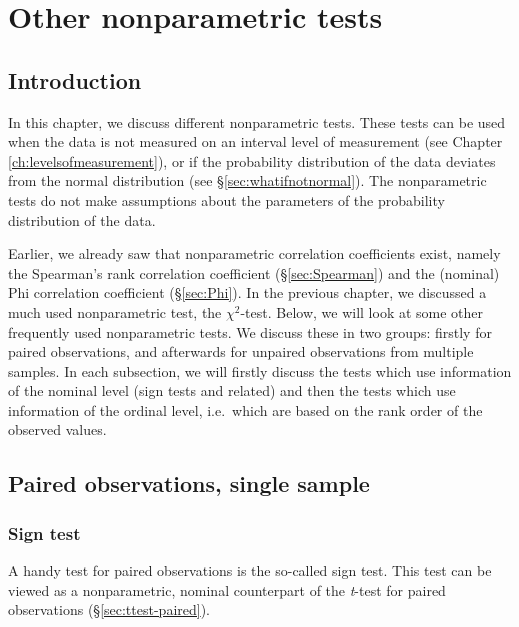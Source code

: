 \documentclass[
]{book}
\begin{document}
\hypertarget{ch:other-nonpar-tests}{%
\chapter{Other nonparametric tests}\label{ch:other-nonpar-tests}}

\hypertarget{sec:h17introduction}{%
\section{Introduction}\label{sec:h17introduction}}

In this chapter, we discuss different nonparametric tests.
These tests can be used when the data is not
measured on an interval level of measurement (see Chapter
\ref{ch:levelsofmeasurement}), or if the probability distribution of the
data deviates from the normal distribution (see
§\ref{sec:whatifnotnormal}). The nonparametric tests do not make
assumptions about the parameters of the probability distribution of the data.

Earlier, we already saw that nonparametric correlation coefficients exist,
namely the Spearman's rank correlation coefficient (§\ref{sec:Spearman})
and the (nominal) Phi correlation coefficient
(§\ref{sec:Phi}). In the previous chapter, we discussed
a much used nonparametric test, the \(\chi^2\)-test. Below, we will look at some other
frequently used nonparametric tests. We discuss these in two groups:
firstly for paired observations, and afterwards for unpaired observations from
multiple samples. In each subsection, we will firstly discuss the tests
which use information of the nominal level (sign tests and related) and
then the tests which use information of the ordinal level, i.e.~which are based on the
rank order of the observed values.

\hypertarget{paired-observations-single-sample}{%
\section{Paired observations, single sample}\label{paired-observations-single-sample}}

\hypertarget{sec:signtest}{%
\subsection{Sign test}\label{sec:signtest}}

A handy test for paired observations is the so-called sign test.
This test can be viewed as a nonparametric, nominal counterpart of
the \emph{t}-test for paired observations
(§\ref{sec:ttest-paired}).
\end{document}
